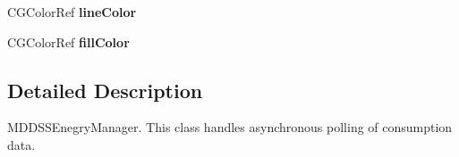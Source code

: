 \begin{DoxyCompactItemize}
\item 
\hypertarget{interface_m_d_d_s_s_consumption_manager_ac8ccb8272ae380d168642d5472b25e25}{C\-G\-Color\-Ref {\bfseries line\-Color}}\label{interface_m_d_d_s_s_consumption_manager_ac8ccb8272ae380d168642d5472b25e25}

\item 
\hypertarget{interface_m_d_d_s_s_consumption_manager_ab668f2d7e7d51b70a0648d9fa2600436}{C\-G\-Color\-Ref {\bfseries fill\-Color}}\label{interface_m_d_d_s_s_consumption_manager_ab668f2d7e7d51b70a0648d9fa2600436}

\end{DoxyCompactItemize}


\subsection{Detailed Description}
M\-D\-D\-S\-S\-Enegry\-Manager. This class handles asynchronous polling of consumption data. 

